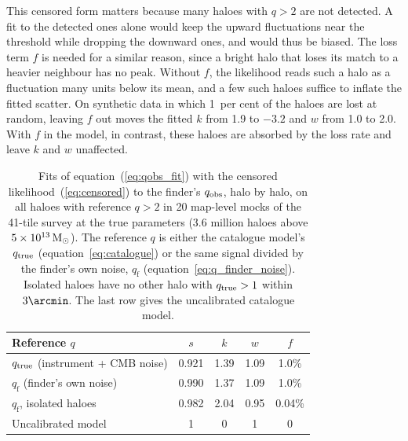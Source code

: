 This censored form matters because many haloes with $q > 2$ are not detected. A fit to the detected ones alone would keep the upward fluctuations near the threshold while dropping the downward ones, and would thus
be biased. The loss term $f$ is needed for a similar reason, since a bright halo that loses its match to a heavier
neighbour has no peak. Without $f$, the likelihood reads such a halo as a fluctuation many units below its
mean, and a few such haloes suffice to inflate the fitted scatter. On synthetic data in which 1~per cent of the
haloes are lost at random, leaving $f$ out moves the fitted $k$ from 1.9 to $-3.2$ and $w$ from 1.0 to 2.0.
With $f$ in the model, in contrast, these haloes are absorbed by the loss rate and leave $k$ and $w$
unaffected.

\begin{table}
\centering
\caption{Fits of equation~(\ref{eq:qobs_fit}) with the censored likelihood~(\ref{eq:censored}) to the
finder's $q_\mathrm{obs}$, halo by halo, on all haloes with reference $q > 2$ in 20 map-level mocks of the 41-tile
survey at the true parameters (3.6 million haloes above $5\times10^{13}\,\mathrm{M}_\odot$). The reference $q$ is either
the catalogue model's $q_\mathrm{true}$ (equation~\ref{eq:catalogue}) or the same signal divided by the finder's own
noise, $q_\mathrm{f}$ (equation~\ref{eq:q_finder_noise}). Isolated haloes have no other halo with
$q_\mathrm{true} > 1$ within $3\arcmin$. The last row gives the uncalibrated catalogue model.}
\label{tab:finderfit}
\begin{tabular}{@{}lcccc@{}}
\toprule
Reference $q$ & $s$ & $k$ & $w$ & $f$ \\
\midrule
$q_\mathrm{true}$ (instrument + CMB noise) & 0.921 & 1.39 & 1.09 & 1.0\% \\
$q_\mathrm{f}$ (finder's own noise) & 0.990 & 1.37 & 1.09 & 1.0\% \\
$q_\mathrm{f}$, isolated haloes & 0.982 & 2.04 & 0.95 & 0.04\% \\
Uncalibrated model & 1 & 0 & 1 & 0 \\
\bottomrule
\end{tabular}
\end{table}


